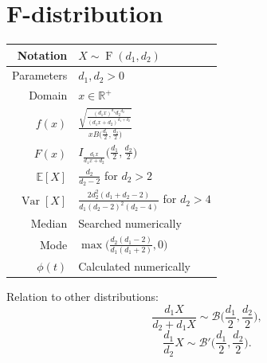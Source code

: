 \documentclass[a4paper,11pt]{article}
\theoremstyle{plain}
\theoremstyle{definition}
\newcommand{\MR}{\mathbb{R}}
\newcommand{\Var}{\operatorname{Var}}
\begin{document}
	\section{F-distribution}
		\begin{center}
			\begin{tabular}{| r | l |}
				\hline
				Notation & $X \sim \operatorname{F}(d_1, d_2)$ \\
				\hline
				Parameters & $d_1, d_2 > 0$ \\
				\hline
				Domain & $x \in \MR^+$  \\
				\hline
				$f(x)$ & $\frac{\sqrt{\frac{(d_1 x)^{d_1} {d_2}^{d_2} }{(d_1x+d_2)^{d_1+d_2}}}}{x B\Big(\frac{d_1}{2},\frac{d_2}{2}\Big)}  $ \\
				\hline
				$F(x)$ & $ I_{\frac{d_1x}{d_1x+d_2}}\Big(\frac{d_1}{2},\frac{d_2}{2}\Big) $\\
				\hline
				$\mathbb{E}[X]$ & $ \frac{d_2}{d_2-2}$ for $ d_2 > 2 $ \\
				\hline
				$\Var[X]$ & $\frac{2d_2^2(d_1+d_2-2)}{d_1(d_2-2)^2(d_2-4)}$ for $d_2 > 4$ \\
				\hline
				Median & Searched numerically \\
				\hline
				Mode & $\max\Big(\frac{d_2(d_1-2)}{d_1(d_1+2)}, 0\Big)$ \\
				\hline
				$\phi(t)$ & Calculated numerically \\
				\hline
			\end{tabular}
		\end{center}
		Relation to other distributions:
		\[
		\frac{d_1X}{d_2 + d_1X} \sim \mathcal{B}\bigg(\frac{d_1}{2}, \frac{d_2}{2} \bigg),
		\]
		\[
		\frac{d_1}{d_2}X \sim \mathcal{B}'\bigg(\frac{d_1}{2}, \frac{d_2}{2} \bigg).
		\]
		
		
	\pagebreak
\end{document}
